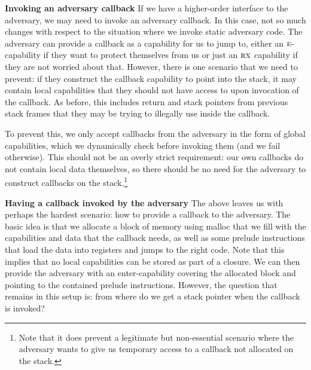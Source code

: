 \documentclass[format=acmsmall, review=true, screen=true]{acmart}
\newcommand{\plainperm}[1]{\textsc{#1}}
\newcommand{\exec}{\plainperm{rx}}
\newcommand{\entry}{\plainperm{e}}
\newcommand{\itoplassug}[1]{}
\begin{document}
\textbf{Invoking an adversary callback} If we have a higher-order interface to
the adversary, we may need to invoke an adversary callback. In this case, not so
much changes with respect to the situation where we invoke static adversary
code. The adversary can provide a callback as a capability for us to jump to,
either an $\entry$-capability if they want to protect themselves from us or just
an $\exec$ capability if they are not worried about that. However, there is one
scenario that we need to prevent: if they construct the callback capability to
point into the stack, it may contain local capabilities that they should not
have access to upon invocation of the callback. As before, this includes return
and stack pointers from previous stack frames that they may be
trying to illegally use inside the callback.

To prevent this, we only accept callbacks from the adversary in the form of
global capabilities, which we dynamically check before invoking them (and we
fail otherwise). This should not be an overly strict requirement: our own
callbacks do not contain local data themselves, so there should be no need for
the adversary to construct callbacks on the stack.\footnote{Note that it does
  prevent a legitimate but non-essential scenario where the adversary wants to
  give us temporary access to a callback not allocated on the stack.}
\itoplassug{Maybe a word on arguments passed from the adversary to us that we pass on to a callback given by the adversary (mentioned by reviewer E, popl, see tex comment.)}


\textbf{Having a callback invoked by the adversary} The above leaves us with
perhaps the hardest scenario: how to provide a callback to the adversary. The
basic idea is that we allocate a block of memory using malloc that we fill with
the capabilities and data that the callback needs, as well as some
prelude instructions that load the data into registers and jumps to the right
code. Note that this implies that no local capabilities can be stored as part of
a closure. We can then provide the adversary with an enter-capability covering
the allocated block and pointing to the contained prelude instructions. However,
the question that remains in this setup is: from where do we get a stack pointer when
the callback is invoked?
\end{document}

